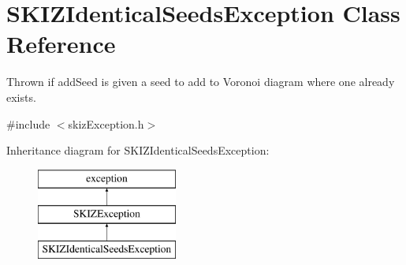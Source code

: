 \hypertarget{classSKIZIdenticalSeedsException}{}\section{S\+K\+I\+Z\+Identical\+Seeds\+Exception Class Reference}
\label{classSKIZIdenticalSeedsException}


Thrown if add\+Seed is given a seed to add to Voronoi diagram where one already exists.  




{\ttfamily \#include $<$skiz\+Exception.\+h$>$}

Inheritance diagram for S\+K\+I\+Z\+Identical\+Seeds\+Exception\+:\begin{figure}[H]
\begin{center}
\leavevmode
\includegraphics[height=3.000000cm]{classSKIZIdenticalSeedsException}
\end{center}
\end{figure}
